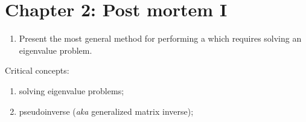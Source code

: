 \section*{Chapter 2: Post mortem I}
\begin{enumerate}
\item Present the most general method for performing a \svdl which requires solving an eigenvalue problem.
\end{enumerate}

Critical concepts:
\begin{enumerate}
\item solving eigenvalue problems;
\item pseudoinverse (\textit{aka} generalized matrix inverse);
\end{enumerate}


\endinput